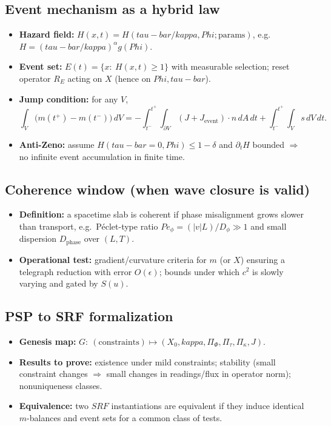 \documentclass[12pt]{article}
\newcommand{\FoldDensity}{\Phi}
\newcommand{\FoldTime}{\bar{\tau}}
\newcommand{\Threshold}{\kappa}
\newcommand{\Survival}{S}
\newcommand{\SRF}{\mathcal{F}_{\mathrm{SR}}}
\def\FoldDensity{Phi}%
\def\FoldTime{tau-bar}%
\def\Threshold{kappa}%
\def\SRF{SRF}%
\def\Survival{S}%
\def\bar#1{#1}%
\def\mathcal#1{#1}%
\def\mathrm#1{#1}%
\begin{document}
\subsection{Event mechanism as a hybrid law}
\begin{itemize}
  \item \textbf{Hazard field:} $H(x,t)=\mathcal{H}(\FoldTime/\Threshold,\FoldDensity;\text{params})$, e.g.\ $H=(\FoldTime/\Threshold)^\alpha g(\FoldDensity)$.
  \item \textbf{Event set:} $E(t)=\{x:\ H(x,t)\ge 1\}$ with measurable selection; reset operator $\mathcal{R}_{E}$ acting on $X$ (hence on $\FoldDensity,\FoldTime$).
  \item \textbf{Jump condition:} for any $V$,
  \[
  \int_V \!\big(m(t^+)-m(t^-)\big)\,dV = -\!\!\int_{t^-}^{t^+}\!\!\!\int_{\partial V}\!(J+J_{\text{event}})\cdot n\,dA\,dt + \!\int_{t^-}^{t^+}\!\!\!\int_V s\,dV\,dt.
  \]
  \item \textbf{Anti-Zeno:} assume $H(\FoldTime{=}0,\FoldDensity)\le 1-\delta$ and $\partial_t H$ bounded $\Rightarrow$ no infinite event accumulation in finite time.
\end{itemize}

\subsection{Coherence window (when wave closure is valid)}
\begin{itemize}
  \item \textbf{Definition:} a spacetime slab is coherent if phase misalignment grows slower than transport, e.g.\ Péclet-type ratio $\mathrm{Pe}_\phi=(|v|L)/D_\phi\gg 1$ and small dispersion $\mathcal{D}_\text{phase}$ over $(L,T)$.
  \item \textbf{Operational test:} gradient/curvature criteria for $m$ (or $X$) ensuring a telegraph reduction with error $O(\epsilon)$; bounds under which $c^2$ is slowly varying and gated by $\Survival(u)$.
\end{itemize}

\subsection{PSP to SRF formalization}
\begin{itemize}
  \item \textbf{Genesis map:} $\mathcal{G}:\ (\text{constraints})\mapsto (X_0,\Threshold,\Pi_\Phi,\Pi_{\bar\tau},\Pi_\kappa,J)$.
  \item \textbf{Results to prove:} existence under mild constraints; stability (small constraint changes $\Rightarrow$ small changes in readings/flux in operator norm); nonuniqueness classes.
  \item \textbf{Equivalence:} two $\SRF$ instantiations are equivalent if they induce identical $m$-balances and event sets for a common class of tests.
\end{itemize}
\end{document}
